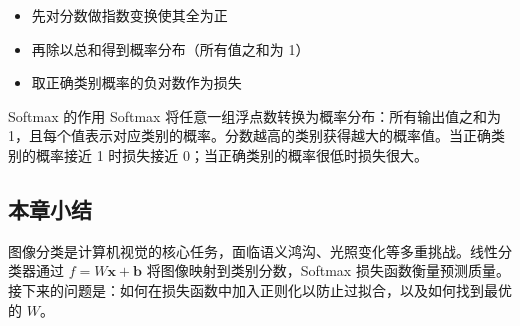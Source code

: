 \begin{itemize}
    \item 先对分数做指数变换使其全为正
    \item 再除以总和得到概率分布（所有值之和为 1）
    \item 取正确类别概率的负对数作为损失
\end{itemize}

\begin{importantbox}{Softmax 的作用}
Softmax 将任意一组浮点数转换为概率分布：所有输出值之和为 1，且每个值表示对应类别的概率。分数越高的类别获得越大的概率值。当正确类别的概率接近 1 时损失接近 0；当正确类别的概率很低时损失很大。
\end{importantbox}

\subsection{本章小结}

图像分类是计算机视觉的核心任务，面临语义鸿沟、光照变化等多重挑战。线性分类器通过 $f = W\mathbf{x} + \mathbf{b}$ 将图像映射到类别分数，Softmax 损失函数衡量预测质量。接下来的问题是：如何在损失函数中加入正则化以防止过拟合，以及如何找到最优的 $W$。


